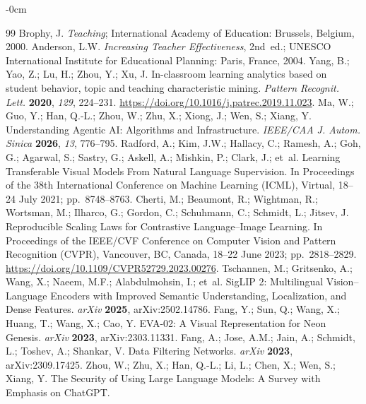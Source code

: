\documentclass[symmetry,article,submit,pdftex,moreauthors]{Definitions/mdpi}
\begin{document}
\begin{adjustwidth}{-\extralength}{0cm}


\begin{thebibliography}{99}
 Brophy, J.
\textit{Teaching}; International Academy of Education: Brussels, Belgium, 2000.
 Anderson, L.W.
\textit{Increasing Teacher Effectiveness}, 2nd~ed.; UNESCO International Institute for Educational Planning: Paris, France, 2004.
 Yang, B.; Yao, Z.; Lu, H.; Zhou, Y.; Xu, J.
In-classroom learning analytics based on student behavior, topic and teaching characteristic mining.
\textit{Pattern Recognit. Lett.} \textbf{2020}, \textit{129}, 224--231. \url{https://doi.org/10.1016/j.patrec.2019.11.023}.
 Ma, W.; Guo, Y.; Han, Q.-L.; Zhou, W.; Zhu, X.; Xiong, J.; Wen, S.; Xiang, Y.
Understanding Agentic AI: Algorithms and Infrastructure.
\textit{IEEE/CAA J. Autom. Sinica} \textbf{2026}, \textit{13}, 776--795.
 Radford, A.; Kim, J.W.; Hallacy, C.; Ramesh, A.; Goh, G.; Agarwal, S.; Sastry, G.; Askell, A.; Mishkin, P.; Clark, J.; et~al.
Learning Transferable Visual Models From Natural Language Supervision.
In Proceedings of the 38th International Conference on Machine Learning (ICML), Virtual, 18--24 July 2021; pp.~8748--8763.
 Cherti, M.; Beaumont, R.; Wightman, R.; Wortsman, M.; Ilharco, G.; Gordon, C.; Schuhmann, C.; Schmidt, L.; Jitsev, J.
Reproducible Scaling Laws for Contrastive Language--Image Learning.
In Proceedings of the IEEE/CVF Conference on Computer Vision and Pattern Recognition (CVPR), Vancouver, BC, Canada, 18--22 June 2023; pp.~2818--2829. \url{https://doi.org/10.1109/CVPR52729.2023.00276}.
 Tschannen, M.; Gritsenko, A.; Wang, X.; Naeem, M.F.; Alabdulmohsin, I.; et~al.
SigLIP 2: Multilingual Vision--Language Encoders with Improved Semantic Understanding, Localization, and Dense Features.
\textit{arXiv} \textbf{2025}, arXiv:2502.14786.
 Fang, Y.; Sun, Q.; Wang, X.; Huang, T.; Wang, X.; Cao, Y.
EVA-02: A Visual Representation for Neon Genesis.
\textit{arXiv} \textbf{2023}, arXiv:2303.11331.
 Fang, A.; Jose, A.M.; Jain, A.; Schmidt, L.; Toshev, A.; Shankar, V.
Data Filtering Networks.
\textit{arXiv} \textbf{2023}, arXiv:2309.17425.
 Zhou, W.; Zhu, X.; Han, Q.-L.; Li, L.; Chen, X.; Wen, S.; Xiang, Y.
The Security of Using Large Language Models: A Survey with Emphasis on ChatGPT.

\end{thebibliography}
\end{adjustwidth}
\end{document}
